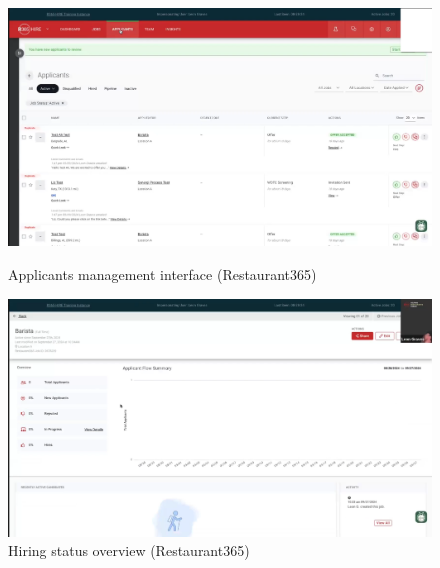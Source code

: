 \documentclass[]{VUMIFTemplateClass}
\begin{document}
\begin{figure}[h]
    \centering
    \begin{minipage}{0.48\textwidth}
        \centering
        \includegraphics[width=\textwidth]{images/examples/applicants_r365.png}
        \caption{Applicants management interface (Restaurant365)}
    \end{minipage}
    \hfill
    \begin{minipage}{0.48\textwidth}
        \centering
        \includegraphics[width=\textwidth]{images/examples/hiring_status_r365.png}
        \caption{Hiring status overview (Restaurant365)}
    \end{minipage}
\end{figure}
\end{document}
